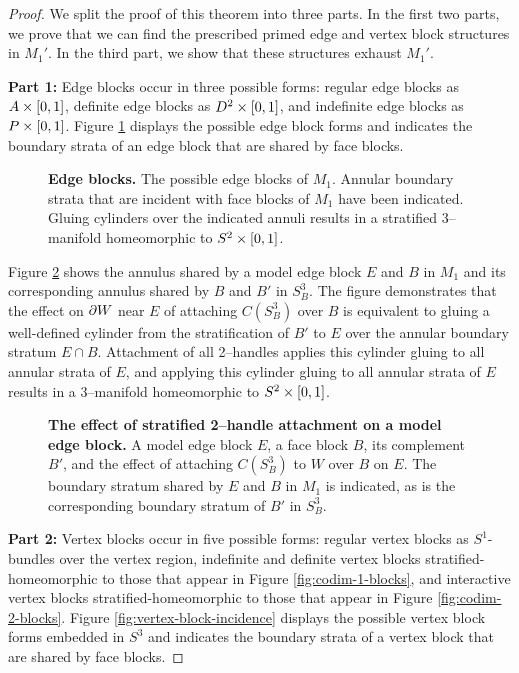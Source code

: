 \begin{proof}
	We split the proof of this theorem into three parts.
	In the first two parts, we prove that we can find the prescribed primed edge and vertex block structures in $M_1'$.
	In the third part, we show that these structures exhaust $M_1'$.
	
	\textbf{Part 1:}
	Edge blocks occur in three possible forms: regular edge blocks as $A\times[0,1]$, definite edge blocks as $D^2\times[0,1]$, and indefinite edge blocks as $P\times[0,1]$.
	Figure \ref{fig:edge-block-incidence} displays the possible edge block forms and indicates the boundary strata of an edge block that are shared by face blocks.
	
	\begin{figure}[h!]
		\caption{
			\textbf{Edge blocks.}
			The possible edge blocks of $M_1$.
			Annular boundary strata that are incident with face blocks of $M_1$ have been indicated.
			Gluing cylinders over the indicated annuli results in a stratified 3--manifold homeomorphic to $S^2\times[0,1]$.
		}
		\label{fig:edge-block-incidence}
	\end{figure}
	
	Figure \ref{fig:edge-face-shared-boundary} shows the annulus shared by a model edge block $E$ and $B$ in $M_1$ and its corresponding annulus shared by $B$ and $B'$ in $S_B^3$.
	The figure demonstrates that the effect on $\partial W$ near $E$ of attaching $C(S_B^3)$ over $B$ is equivalent to gluing a well-defined cylinder from the stratification of $B'$  to $E$ over the annular boundary stratum $E\cap B$.
	Attachment of all 2--handles applies this cylinder gluing to all annular strata of $E$, and applying this cylinder gluing to all annular strata of $E$ results in a 3--manifold homeomorphic to $S^2\times[0,1]$.

	\begin{figure}[h!]
		\caption{
			\textbf{The effect of stratified 2--handle attachment on a model edge block.}
			A model edge block $E$, a face block $B$, its complement $B'$, and the effect of attaching $C(S_B^3)$ to $W$ over $B$ on $E$.
			The boundary stratum shared by $E$ and $B$ in $M_1$ is indicated, as is the corresponding boundary stratum of $B'$ in $S_B^3$.
		}
		\label{fig:edge-face-shared-boundary}
	\end{figure}
	
	\textbf{Part 2:}	
	Vertex blocks occur in five possible forms: regular vertex blocks as $S^1$-bundles over the vertex region, indefinite and definite vertex blocks stratified-homeomorphic to those that appear in Figure \ref{fig:codim-1-blocks}, and interactive vertex blocks stratified-homeomorphic to those that appear in Figure \ref{fig:codim-2-blocks}.
	Figure \ref{fig:vertex-block-incidence} displays the possible vertex block forms embedded in $S^3$ and indicates the boundary strata of a vertex block that are shared by face blocks.
	

\end{proof}
